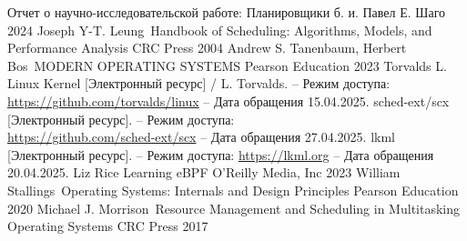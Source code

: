 \documentclass[12pt, oneside]{book}
\begin{document}
\renewcommand{\bibname}{\large СПИСОК ИСПОЛЬЗОВАННЫХ ИСТОЧНИКОВ}
\begin{thebibliography}{9}
  \vspace*{0.3cm}
  Отчет о научно-исследовательской работе: Планировщики б. и. Павел Е. Шаго 2024
  Joseph Y-T. Leung\ Handbook of Scheduling: Algorithms, Models, and
  Performance Analysis CRC Press 2004
  Andrew S. Tanenbaum, Herbert Bos\ MODERN OPERATING SYSTEMS Pearson
  Education 2023
  Torvalds L. Linux Kernel [Электронный ресурс] / L. Torvalds.
  -- Режим доступа: \url{https://github.com/torvalds/linux} -- Дата обращения
  15.04.2025.
  sched-ext/scx [Электронный ресурс]. -- Режим доступа: \\
  \url{https://github.com/sched-ext/scx} -- Дата обращения 27.04.2025.
  lkml [Электронный ресурс]. -- Режим доступа: \url{https://lkml.org}
  -- Дата обращения 20.04.2025.
  Liz Rice Learning eBPF O’Reilly Media, Inc 2023
  William Stallings\ Operating Systems: Internals and
  Design Principles Pearson Education 2020
  Michael J. Morrison\ Resource Management and Scheduling
  in Multitasking Operating Systems CRC Press 2017
\end{thebibliography}
\end{document}
